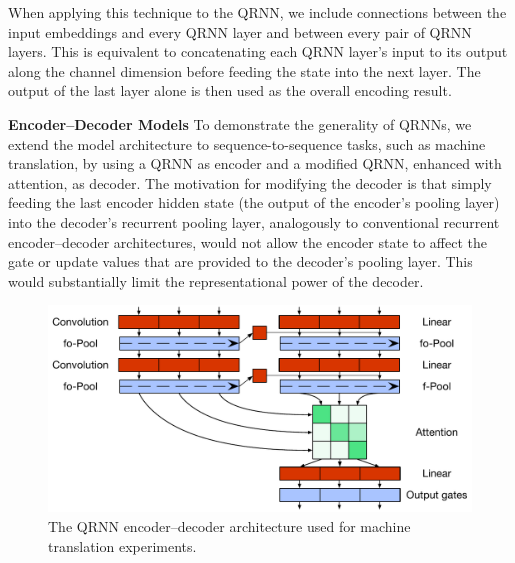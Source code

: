 \documentclass{article} %
\begin{document}
When applying this technique to the QRNN, we include connections between the input embeddings and every QRNN layer and between every pair of QRNN layers. This is equivalent to concatenating each QRNN layer's input to its output along the channel dimension before feeding the state into the next layer. The output of the last layer alone is then used as the overall encoding result.

\textbf{Encoder--Decoder Models} \label{sec:seq2seq}
To demonstrate the generality of QRNNs, we extend the model architecture to sequence-to-sequence tasks, such as machine translation, by using a QRNN as encoder and a modified QRNN, enhanced with attention, as decoder. The motivation for modifying the decoder is that simply feeding the last encoder hidden state (the output of the encoder's pooling layer) into the decoder's recurrent pooling layer, analogously to conventional recurrent encoder--decoder architectures, would not allow the encoder state to affect the gate or update values that are provided to the decoder's pooling layer. This would substantially limit the representational power of the decoder.
\begin{figure}
\centering
\includegraphics[width=.99\linewidth]{attn_qrnn_arch.pdf}
\caption{The QRNN encoder--decoder architecture used for machine translation experiments.}
\end{figure}
\end{document}
